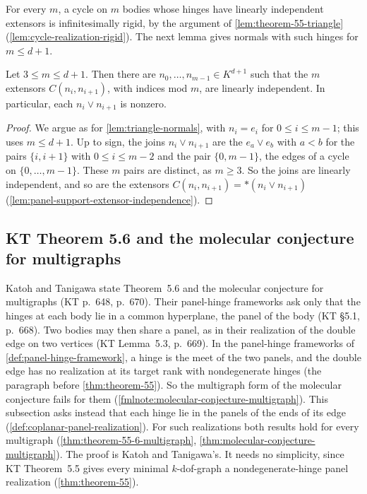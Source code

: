 For every $m$, a cycle on $m$ bodies whose hinges have linearly
independent extensors is infinitesimally rigid, by the argument of
\cref{lem:theorem-55-triangle} (\cref{lem:cycle-realization-rigid}). The
next lemma gives normals with such hinges for $m \le d + 1$.

\begin{lemma}
  \label{lem:cycle-normals}
  \leanok
  Let $3 \le m \le d + 1$. Then there are
  $n_0, \dots, n_{m-1} \in K^{d+1}$ such that the $m$ extensors
  $C(n_i, n_{i+1})$, with indices mod $m$, are linearly independent. In
  particular, each $n_i \vee n_{i+1}$ is nonzero.
\end{lemma}
\begin{proof}
  \leanok
  We argue as for \cref{lem:triangle-normals}, with $n_i = e_i$ for
  $0 \le i \le m - 1$; this uses $m \le d + 1$. Up to sign, the joins
  $n_i \vee n_{i+1}$ are the $e_a \vee e_b$ with $a < b$ for the pairs
  $\{i, i+1\}$ with $0 \le i \le m - 2$ and the pair $\{0, m-1\}$, the
  edges of a cycle on $\{0, \dots, m-1\}$. These $m$ pairs are distinct,
  as $m \ge 3$. So the joins are linearly independent, and so are the
  extensors $C(n_i, n_{i+1}) = *(n_i \vee n_{i+1})$
  (\cref{lem:panel-support-extensor-independence}).
\end{proof}

\subsection{KT Theorem 5.6 and the molecular conjecture for multigraphs}
\label{sec:molecular-coplanar-multigraph}

Katoh and Tanigawa state Theorem~5.6 and the molecular conjecture for
multigraphs (KT p.~648, p.~670). Their panel-hinge frameworks ask only
that the hinges at each body lie in a common hyperplane, the panel of
the body (KT \S5.1, p.~668). Two bodies may then share a panel, as in
their realization of the double edge on two vertices (KT Lemma~5.3,
p.~669). In the panel-hinge frameworks of
\cref{def:panel-hinge-framework}, a hinge is the meet of the two panels,
and the double edge has no realization at its target rank with
nondegenerate hinges (the paragraph before \cref{thm:theorem-55}). So
the multigraph form of the molecular conjecture fails for them
(\cref{fmlnote:molecular-conjecture-multigraph}). This subsection asks
instead that each hinge lie in the panels of the ends of its edge
(\cref{def:coplanar-panel-realization}). For such realizations both
results hold for every multigraph (\cref{thm:theorem-55-6-multigraph},
\cref{thm:molecular-conjecture-multigraph}). The proof is Katoh and
Tanigawa's. It needs no simplicity, since KT Theorem~5.5 gives every
minimal $k$-dof-graph a nondegenerate-hinge panel realization
(\cref{thm:theorem-55}).

